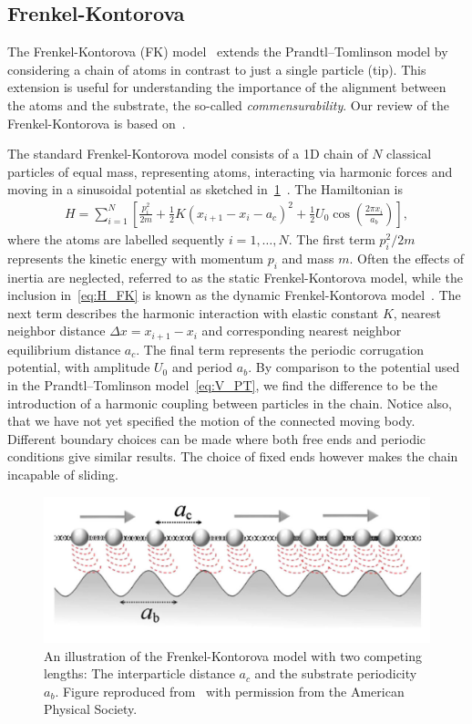 \subsection{Frenkel-Kontorova}
The Frenkel-Kontorova (\acrshort{FK}) model~\cite{Frenkel_1938} extends the Prandtl–Tomlinson model by considering a chain of atoms in contrast to just a single particle (tip). This extension is useful for understanding the importance of the alignment between the atoms and the substrate, the so-called \textit{commensurability}. Our review of the Frenkel-Kontorova is based on~\cite{Manini_2016, Vanossi_2013}.

The standard Frenkel-Kontorova model consists of a 1D chain of $N$ classical particles of equal mass, representing atoms, interacting via harmonic forces and moving in a sinusoidal potential as sketched in~\cref{fig:FK_model}~\cite{Manini_2016}. The Hamiltonian is 
\begin{align}
  H = \sum_{i=1}^N \left[\frac{p_i^2}{2m} + \frac{1}{2}K(x_{i+1} - x_i - a_c)^2 + \frac{1}{2}U_0 \cos{\left(\frac{2\pi x_i}{a_b}\right)}\right],
  \label{eq:H_FK}
\end{align}
where the atoms are labelled sequently $i = 1, \hdots, N$. The first term $p_i^2/2m$ represents the kinetic energy with momentum $p_i$
and mass $m$. Often the effects of inertia are neglected, referred to as the static Frenkel-Kontorova model, while the inclusion in~\cref{eq:H_FK} is known as the dynamic Frenkel-Kontorova model~\cite{FK2D}. The next term describes the harmonic interaction with elastic
constant $K$, nearest neighbor distance $\Delta x = x_{i+1} - x_i$ and 
corresponding nearest neighbor equilibrium distance $a_c$. The final term represents the periodic corrugation potential, with amplitude $U_0$ and period $a_b$. By comparison to the potential used in the Prandtl–Tomlinson model~\cref{eq:V_PT}, we find the difference to be the introduction of a harmonic coupling between particles in the chain. Notice also, that we have not yet specified the motion of the connected moving body. Different boundary choices can be made where both free ends and periodic conditions give similar results. The choice of fixed ends however makes the chain incapable of sliding.

\begin{figure}[!htb]
  \centering
  \includegraphics[width=0.6\linewidth]{figures/theory/FK_model.png}
  \caption{An illustration of the Frenkel-Kontorova model with two competing lengths: The interparticle distance $a_c$ and the substrate periodicity $a_b$. Figure reproduced from~\cite{Vanossi_2013} with permission from the American Physical Society.}
  \label{fig:FK_model}
\end{figure}

